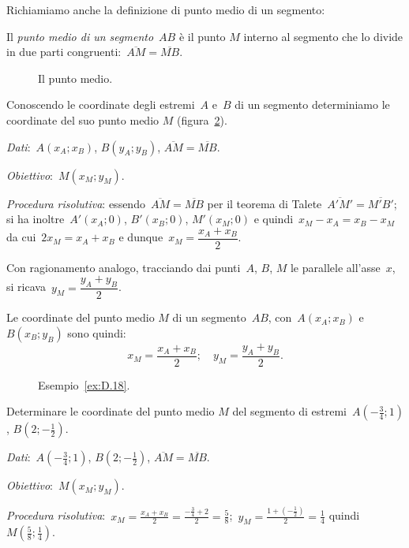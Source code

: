 Richiamiamo anche la definizione di punto medio di un segmento:
\begin{definizione}
 Il \emph{punto medio di un segmento}~$AB$ è il punto $M$ interno
al segmento che lo divide in due parti congruenti:~$\overline{AM}=\overline{MB}$.
\end{definizione}

  \begin{figure}[h]
  \centering
  \caption{Il punto medio.}\label{fig:D.17}
 \end{figure}

\pagebreak
\begin{exrig}
 \begin{esempio}
\label{ex:D.18}
 Conoscendo le coordinate degli estremi~$A$ e~$B$ di un segmento determiniamo
le coordinate del suo punto medio $M$ (figura~\ref{fig:D.18}).

\emph{Dati}:~$A(x_A;x_B)$, $B(y_A;y_B)$, $\overline{AM} = \overline{MB}$.

\emph{Obiettivo}:~$M(x_{M};y_{M})$.

\emph{Procedura risolutiva}: essendo~$\overline{AM}=\overline{MB}$ per il teorema di Talete~$\overline{A'M'}=\overline{M'B'}$;
si ha inoltre~$A'(x_{A};0)$, $B'(x_{B};0)$, $M'(x_{M};0)$ e quindi~$x_{M}-x_{A}=x_{B}-x_{M}$
da cui~$2x_{M}=x_{A}+x_{B}$ e dunque~$x_{M}=\dfrac{x_{A}+x_{B}}{2}$.

Con ragionamento analogo, tracciando dai punti~$A$, $B$, $M$ le parallele all'asse~$x$, si ricava~$y_{M}=\dfrac{y_{A}+y_{B}}{2}$.

Le coordinate del punto medio $M$ di un segmento~$AB$, con~$A(x_{A};x_{B})$ e $B(x_{B};y_{B})$ sono quindi:
\[x_{M}=\dfrac{x_{A}+x_{B}}{2};\quad y_{M}=\dfrac{y_{A}+y_{B}}{2}.\]
\end{esempio}

\begin{figure}[t]
   \centering
  \caption{Esempio~\ref{ex:D.18}.}\label{fig:D.18}
\end{figure}

 \begin{esempio}
Determinare le coordinate del punto medio $M$ del segmento di estremi~$A\left(-{\frac{3}{4}};1\right)$, $B\left(2;-\frac{1}{2}\right)$.

\emph{Dati}:~$A\left(-{\frac{3}{4}};1\right)$, $B\left(2;-\frac{1}{2}\right)$, $\overline{AM}=\overline{MB}$.

\emph{Obiettivo}:~$M(x_{M};y_{M})$.

\emph{Procedura risolutiva}:~$x_{M}=\frac{x_{A}+x_{B}}{2}=\frac{-{\frac{3}{4}}+2}{2}=\frac{5}{8}$;\,
$y_{M}=\frac{1+\left(-{\frac{1}{2}}\right)}{2}=\frac{1}{4}$ quindi~$M\left(\frac{5}{8};\frac{1}{4}\right)$.
 \end{esempio}
\end{exrig}

